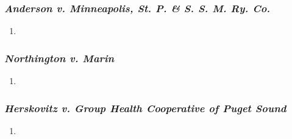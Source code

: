 \subsubsection{\emph{Anderson v. Minneapolis, St. P. \& S. S. M. Ry. Co.}}

\begin{enumerate}
    \item
\end{enumerate}

\subsubsection{\emph{Northington v. Marin}}

\begin{enumerate}
    \item
\end{enumerate}

\subsubsection{\emph{Herskovitz v. Group Health Cooperative of Puget Sound}}

\begin{enumerate}
    \item
\end{enumerate}

